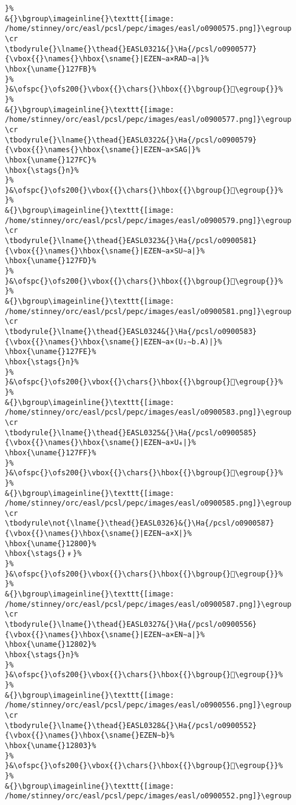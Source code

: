 \begin{verbatim}
}%
&{}\bgroup\imageinline{}\texttt{[image: /home/stinney/orc/easl/pcsl/pepc/images/easl/o0900575.png]}\egroup
\cr
\tbodyrule{}\lname{}\thead{}EASL0321&{}\Ha{/pcsl/o0900577}{\vbox{{}\names{}\hbox{\sname{}|EZEN∼a×RAD∼a|}%
\hbox{\uname{}127FB}%
}%
}&\ofspc{}\ofs200{}\vbox{{}\chars{}\hbox{{}\bgroup{}𒟻\egroup{}}%
}%
&{}\bgroup\imageinline{}\texttt{[image: /home/stinney/orc/easl/pcsl/pepc/images/easl/o0900577.png]}\egroup
\cr
\tbodyrule{}\lname{}\thead{}EASL0322&{}\Ha{/pcsl/o0900579}{\vbox{{}\names{}\hbox{\sname{}|EZEN∼a×SAG|}%
\hbox{\uname{}127FC}%
\hbox{\stags{}n}%
}%
}&\ofspc{}\ofs200{}\vbox{{}\chars{}\hbox{{}\bgroup{}𒟼\egroup{}}%
}%
&{}\bgroup\imageinline{}\texttt{[image: /home/stinney/orc/easl/pcsl/pepc/images/easl/o0900579.png]}\egroup
\cr
\tbodyrule{}\lname{}\thead{}EASL0323&{}\Ha{/pcsl/o0900581}{\vbox{{}\names{}\hbox{\sname{}|EZEN∼a×SU∼a|}%
\hbox{\uname{}127FD}%
}%
}&\ofspc{}\ofs200{}\vbox{{}\chars{}\hbox{{}\bgroup{}𒟽\egroup{}}%
}%
&{}\bgroup\imageinline{}\texttt{[image: /home/stinney/orc/easl/pcsl/pepc/images/easl/o0900581.png]}\egroup
\cr
\tbodyrule{}\lname{}\thead{}EASL0324&{}\Ha{/pcsl/o0900583}{\vbox{{}\names{}\hbox{\sname{}|EZEN∼a×(U₂∼b.A)|}%
\hbox{\uname{}127FE}%
\hbox{\stags{}n}%
}%
}&\ofspc{}\ofs200{}\vbox{{}\chars{}\hbox{{}\bgroup{}𒟾\egroup{}}%
}%
&{}\bgroup\imageinline{}\texttt{[image: /home/stinney/orc/easl/pcsl/pepc/images/easl/o0900583.png]}\egroup
\cr
\tbodyrule{}\lname{}\thead{}EASL0325&{}\Ha{/pcsl/o0900585}{\vbox{{}\names{}\hbox{\sname{}|EZEN∼a×U₄|}%
\hbox{\uname{}127FF}%
}%
}&\ofspc{}\ofs200{}\vbox{{}\chars{}\hbox{{}\bgroup{}𒟿\egroup{}}%
}%
&{}\bgroup\imageinline{}\texttt{[image: /home/stinney/orc/easl/pcsl/pepc/images/easl/o0900585.png]}\egroup
\cr
\tbodyrule\not{\lname{}\thead{}EASL0326}&{}\Ha{/pcsl/o0900587}{\vbox{{}\names{}\hbox{\sname{}|EZEN∼a×X|}%
\hbox{\uname{}12800}%
\hbox{\stags{}﹟}%
}%
}&\ofspc{}\ofs200{}\vbox{{}\chars{}\hbox{{}\bgroup{}𒠀\egroup{}}%
}%
&{}\bgroup\imageinline{}\texttt{[image: /home/stinney/orc/easl/pcsl/pepc/images/easl/o0900587.png]}\egroup
\cr
\tbodyrule{}\lname{}\thead{}EASL0327&{}\Ha{/pcsl/o0900556}{\vbox{{}\names{}\hbox{\sname{}|EZEN∼a×EN∼a|}%
\hbox{\uname{}12802}%
\hbox{\stags{}n}%
}%
}&\ofspc{}\ofs200{}\vbox{{}\chars{}\hbox{{}\bgroup{}𒠂\egroup{}}%
}%
&{}\bgroup\imageinline{}\texttt{[image: /home/stinney/orc/easl/pcsl/pepc/images/easl/o0900556.png]}\egroup
\cr
\tbodyrule{}\lname{}\thead{}EASL0328&{}\Ha{/pcsl/o0900552}{\vbox{{}\names{}\hbox{\sname{}EZEN∼b}%
\hbox{\uname{}12803}%
}%
}&\ofspc{}\ofs200{}\vbox{{}\chars{}\hbox{{}\bgroup{}𒠃\egroup{}}%
}%
&{}\bgroup\imageinline{}\texttt{[image: /home/stinney/orc/easl/pcsl/pepc/images/easl/o0900552.png]}\egroup

\end{verbatim}
